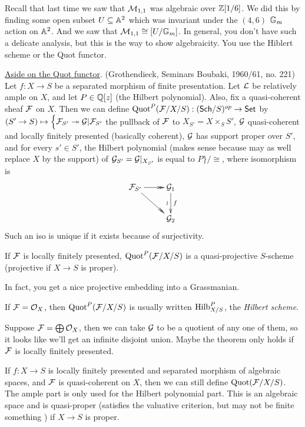 
 Recall that last time we saw that $\M_{1,1}$ was algebraic over $\ZZ[1/6]$. We did this
 by finding some open subset $U\subseteq \AA^2$ which was invariant under the $(4,6)$
 $\GG_m$ action on $\AA^2$. And we saw that $\M_{1,1}\cong [U/\GG_m]$. In general, you
 don't have such a delicate analysis, but this is the way to show algebraicity. You use
 the Hiblert scheme or the Quot functor.

 \underline{Aside on the Quot functor}. (Grothendieck, Seminars Boubaki, 1960/61, no.
 221) Let $f:X\to S$ be a separated morphism of finite presentation. Let $\L$ be
 relatively ample on $X$, and let $P\in \QQ[z]$ (the Hilbert polynomial). Also, fix a
 quasi-coherent sheaf $\F$ on $X$. Then we can define $\quot^P(\F/X/S):(\sch/S)^{op}\to
 \set$ by $(S'\to S)\mapsto \Bigl\{\F_{S'}\twoheadrightarrow \G| \F_{S'}$ the pullback of
 $\F$ to $X_{S'}=X\times_S S'$, $\G$ quasi-coherent and locally finitely presented
 (basically coherent), $\G$ has support proper over $S'$, and for every $s'\in S'$, the
 Hilbert polynomial (makes sense because may as well replace $X$ by the support) of $\G_{S'}=\G|_{X_{S'}}$ is equal to $P\Bigr\}/\cong$, where
 isomorphism is
 \[\xymatrix{
    \F_{S'}\ar@{->>}[r]\ar@{->>}[dr] & \G_1\ar[d]_\wr^f\\
    & \G_2
 }\]
 Such an iso is unique if it exists because of surjectivity.
 \begin{theorem}[Grothendieck]
   If $\F$ is locally finitely presented, $\quot^P(\F/X/S)$ is a quasi-projective
   $S$-scheme (projective if $X\to S$ is proper).
 \end{theorem}
 In fact, you get a nice projective embedding into a Grassmanian.
 \begin{remark}
   If $\F=\O_X$, then $\quot^P(\F/X/S)$ is usually written $\hilb^P_{X/S}$, the
   \emph{Hilbert scheme}.
 \end{remark}
 \begin{example}
   Suppose $\F=\bigoplus \O_X$, then we can take $\G$ to be a quotient of any one of
   them, so it looks like we'll get an infinite disjoint union. Maybe the theorem only
   holds if $\F$ is locally finitely presented.
 \end{example}
 \begin{remark}
   If $f:X\to S$ is locally finitely presented and separated morphism of algebraic
   spaces, and $\F$ is quasi-coherent on $X$, then we can still define $\quot(\F/X/S)$.
   The ample part is only used for the Hilbert polynomial part. This is an algebraic
   space and is quasi-proper (satisfies the valuative criterion, but may not be finite
   something \anton{}) if $X\to S$ is proper.
 \end{remark}
